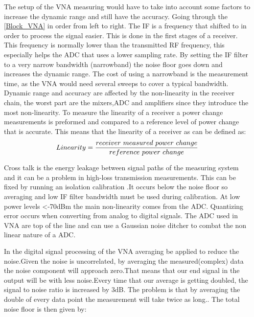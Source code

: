 The setup of the \gls{VNA} measuring would have to take into account some factors to increase the dynamic range and still have the accuracy. Going through the \ref{Block_VNA} in order from left to right.
The \gls{IF} is a frequency that shifted to in order to process the signal easier. This is done in the first stages of a receiver. This frequency is normally lower than the transmitted RF frequency, this especially helps the \gls{ADC} that uses a lower sampling rate. 
By setting the \gls{IF} filter to a very narrow bandwidth (narrowband) the noise floor goes down and increases the dynamic range. The cost of using a narrowband is the measurement time, as the \gls{VNA} would need several sweeps to cover a typical bandwidth. \\

Dynamic range and accuracy are affected by the non-linearity in the receiver chain, the worst part are the mixers,\gls{ADC} and amplifiers since they introduce the most non-linearity. To measure the linearity of a receiver a power change measurements is preformed and compared to a reference level of power change that is accurate. This means that the linearity of a receiver as can be defined as:
\begin{equation}
Linearity = \frac{receiver \\\ measured \\\ power \\\ change}{reference \ power \ change}
\label{Linearity}
\end{equation}
 

Cross talk is the energy leakage between signal paths of the measuring system and it can be a problem in high-loss transmission measurements. This can be fixed by running an isolation calibration \citep{crosstalk}.It occurs below the noise floor so averaging and low \gls{IF} filter bandwidth must be used during calibration.
At low power levels <-70dBm the main non-linearity comes from the \gls{ADC}. Quantizing error occurs when converting from analog to digital signals. The \gls{ADC} used in \gls{VNA} are top of the line and can use a Gaussian noise ditcher to combat the non linear nature of a \gls{ADC}. 


In the digital signal processing of the \gls{VNA} averaging be applied to reduce the noise.Given the noise is uncorrelated, by averaging the measured(complex) data the noise component will approach zero.That means that our end signal in the output will be with less noise.Every time that our average is getting doubled, the signal to noise ratio is increased by 3dB. The problem is that by averaging the double of every data point the measurement will take twice as long.\citep{KeysightAVG}. The total noise floor is then given by:

